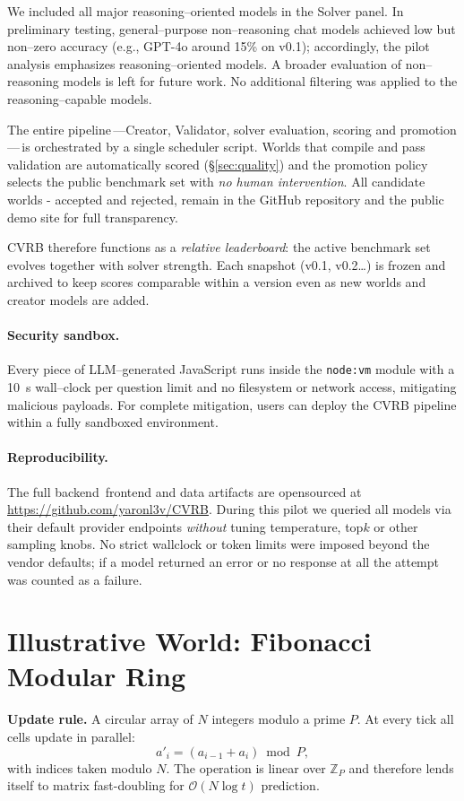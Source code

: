 \documentclass[11pt]{article}
\begin{document}
We included all major reasoning--oriented models in the Solver panel. In preliminary testing, general--purpose non--reasoning chat models achieved low but non--zero accuracy (e.g., GPT-4o around 15\% on v0.1); accordingly, the pilot analysis emphasizes reasoning--oriented models. A broader evaluation of non--reasoning models is left for future work. No additional filtering was applied to the reasoning--capable models.

The entire pipeline\,---Creator, Validator, solver evaluation, scoring and promotion---\,is orchestrated by a single scheduler script. Worlds that compile and pass validation are automatically scored (\S\ref{sec:quality}) and the promotion policy selects the public benchmark set with \emph{no human intervention}. All candidate worlds - accepted and rejected, remain in the GitHub repository and the public demo site for full transparency.

CVRB therefore functions as a \emph{relative leaderboard}: the active benchmark set evolves together with solver strength. Each snapshot (v0.1, v0.2\ldots) is frozen and archived to keep scores comparable within a version even as new worlds and creator models are added.

\paragraph{Security sandbox.} Every piece of LLM--generated JavaScript runs inside the \verb|node:vm| module with a 10~s wall--clock per question limit and no filesystem or network access, mitigating malicious payloads.
For complete mitigation, users can deploy the CVRB pipeline within a fully sandboxed environment.

\paragraph{Reproducibility.} The full backend\, front\-end and data artifacts are open\-sourced at \url{https://github.com/yaronl3v/CVRB}. During this pilot we queried all models via their default provider endpoints \emph{without} tuning temperature, top\-$k$ or other sampling knobs. No strict wall\-clock or token limits were imposed beyond the vendor defaults; if a model returned an error or no response at all the attempt was counted as a failure.

\section{Illustrative World: Fibonacci Modular Ring}
\label{sec:fib}
\textbf{Update rule.} A circular array of $N$ integers modulo a prime $P$. At every tick all cells update in parallel:
\[
  a'_i = (a_{i-1}+a_i) \bmod P ,
\]
with indices taken modulo $N$. The operation is linear over $\mathbb{Z}_P$ and therefore lends itself to matrix fast-doubling for $\mathcal{O}(N\log t)$ prediction.
\end{document}
